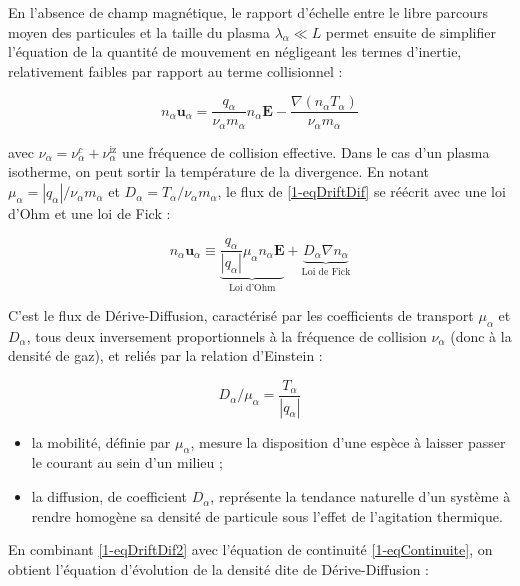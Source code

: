 \begin{refsection}
En l'absence de champ magnétique, le rapport d'échelle entre le libre parcours moyen des particules
et la taille du plasma $\lambda_\alpha\ll L$ permet ensuite de simplifier
l'équation de la quantité de mouvement en négligeant les termes d'inertie, relativement
faibles par rapport au terme collisionnel :

\begin{equation}
\label{1-eqDriftDif}
n_\alpha\mathbf u_\alpha=\frac{q_\alpha}{\nu_\alpha m_\alpha}n_\alpha\mathbf
E-\frac{\nabla\left(n_\alpha T_\alpha\right)}{\nu_\alpha
m_\alpha}
\end{equation}

avec $\nu_\alpha=\nu_\alpha^c+\nu_\alpha^\text{iz}$ une fréquence de collision
effective. Dans le cas d'un plasma isotherme, on peut sortir la température de
la divergence.
En notant $\mu_\alpha=|q_\alpha|/\nu_\alpha m_\alpha$ et
$D_\alpha=T_\alpha/\nu_\alpha m_\alpha$, le flux de \eqref{1-eqDriftDif} se
réécrit avec une loi d'Ohm et une loi de Fick :

\begin{equation}
\label{1-eqDriftDif2}
n_\alpha\mathbf u_\alpha\equiv\underbrace{\frac{q_\alpha}{|q_\alpha|}\mu_\alpha n_\alpha\mathbf E}_\text{Loi d'Ohm}+\underbrace{D_\alpha{\nabla n_\alpha}}_\text{Loi
de Fick}
\end{equation}

 C'est le flux de Dérive-Diffusion, caractérisé par les coefficients de
transport $\mu_\alpha$ et
$D_\alpha$, tous deux inversement proportionnels à la fréquence de collision
$\nu_\alpha$ (donc à la densité de gaz), et reliés par la relation d'Einstein :

\begin{equation}
\label{1-EinsteinRelation}
D_\alpha/\mu_\alpha=\frac{T_\alpha}{|q_\alpha|}
\end{equation}

\begin{itemize}
  \item la mobilité, définie par $\mu_\alpha$,
  mesure la disposition d'une espèce à laisser passer le courant au sein d'un
  milieu ; 
  \item la diffusion, de coefficient $D_\alpha$,
  représente la tendance naturelle d'un système à rendre homogène sa densité de particule sous l'effet
  de l'agitation thermique.
\end{itemize}

En combinant \eqref{1-eqDriftDif2} avec l'équation de continuité
\eqref{1-eqContinuite}, on obtient l'équation d'évolution de la densité
dite de Dérive-Diffusion :
 

\end{refsection}
